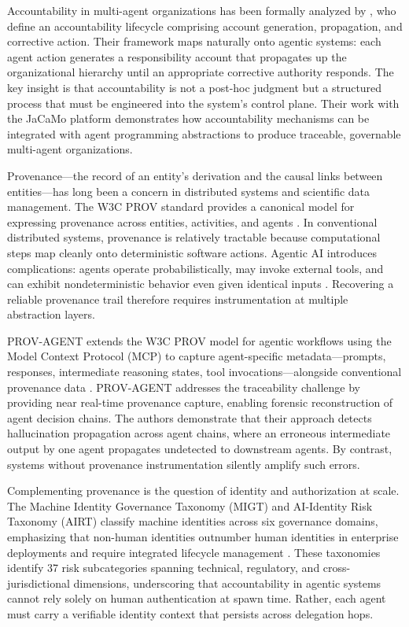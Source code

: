 Accountability in multi-agent organizations has been formally analyzed by \cite{ferrandin2022accountability}, who define an accountability lifecycle comprising account generation, propagation, and corrective action. Their framework maps naturally onto agentic systems: each agent action generates a responsibility account that propagates up the organizational hierarchy until an appropriate corrective authority responds. The key insight is that accountability is not a post-hoc judgment but a structured process that must be engineered into the system's control plane. Their work with the JaCaMo platform demonstrates how accountability mechanisms can be integrated with agent programming abstractions to produce traceable, governable multi-agent organizations.


Provenance---the record of an entity's derivation and the causal links between entities---has long been a concern in distributed systems and scientific data management. The W3C PROV standard provides a canonical model for expressing provenance across entities, activities, and agents \cite{moreau2023prov}. In conventional distributed systems, provenance is relatively tractable because computational steps map cleanly onto deterministic software actions. Agentic AI introduces complications: agents operate probabilistically, may invoke external tools, and can exhibit nondeterministic behavior even given identical inputs \cite{openclaw2025forensic}. Recovering a reliable provenance trail therefore requires instrumentation at multiple abstraction layers.

PROV-AGENT extends the W3C PROV model for agentic workflows using the Model Context Protocol (MCP) to capture agent-specific metadata---prompts, responses, intermediate reasoning states, tool invocations---alongside conventional provenance data \cite{provagent2025}. PROV-AGENT addresses the traceability challenge by providing near real-time provenance capture, enabling forensic reconstruction of agent decision chains. The authors demonstrate that their approach detects hallucination propagation across agent chains, where an erroneous intermediate output by one agent propagates undetected to downstream agents. By contrast, systems without provenance instrumentation silently amplify such errors.

Complementing provenance is the question of identity and authorization at scale. The Machine Identity Governance Taxonomy (MIGT) and AI-Identity Risk Taxonomy (AIRT) classify machine identities across six governance domains, emphasizing that non-human identities outnumber human identities in enterprise deployments and require integrated lifecycle management \cite{migt2025}. These taxonomies identify 37 risk subcategories spanning technical, regulatory, and cross-jurisdictional dimensions, underscoring that accountability in agentic systems cannot rely solely on human authentication at spawn time. Rather, each agent must carry a verifiable identity context that persists across delegation hops.

